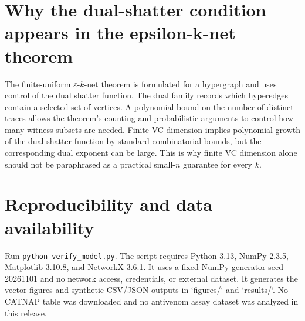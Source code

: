 \documentclass[11pt,a4paper]{article}
\newcommand{\eps}{\varepsilon}
\begin{document}
\section{Why the dual-shatter condition appears in the epsilon-k-net theorem}
The finite-uniform $\eps$-$k$-net theorem is formulated for a hypergraph and uses control of the dual shatter function. The dual family records which hyperedges contain a selected set of vertices. A polynomial bound on the number of distinct traces allows the theorem's counting and probabilistic arguments to control how many witness subsets are needed. Finite VC dimension implies polynomial growth of the dual shatter function by standard combinatorial bounds, but the corresponding dual exponent can be large. This is why finite VC dimension alone should not be paraphrased as a practical small-$n$ guarantee for every $k$.

\section{Reproducibility and data availability}
Run \verb|python verify_model.py|. The script requires Python 3.13, NumPy 2.3.5, Matplotlib 3.10.8, and NetworkX 3.6.1. It uses a fixed NumPy generator seed 20261101 and no network access, credentials, or external dataset. It generates the vector figures and synthetic CSV/JSON outputs in `figures/` and `results/`. No CATNAP table was downloaded and no antivenom assay dataset was analyzed in this release.
\end{document}
